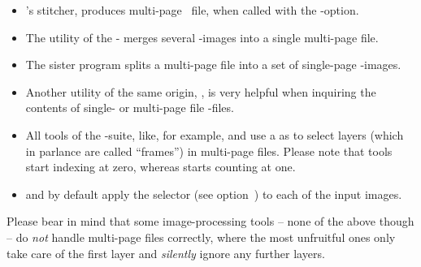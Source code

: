\begin{itemize}
\item
  's stitcher, 
  produces multi-page ~file, when called with the -option.

\item
  The utility  of the
  - merges several
  -images into a single multi-page file.

\item
  The sister program  splits a
  multi-page file into a set of single-page -images.

\item
  Another utility of the same origin, , is
  very helpful when inquiring the contents of single- or multi-page file -files.

\item
  All tools of the -suite, like, for example,
   and  use a
   as \App{} to select layers
  (which in  parlance are called ``frames'') in multi-page files.
  Please note that  tools start indexing at zero, whereas \App{} starts
  counting at one.

\item
  \App{} and \OtherApp{} by default apply the  selector (see
  option~) to each of the input
  images.
\end{itemize}

Please bear in mind that some image-processing tools -- none of the above though -- do
\emph{not} handle multi-page files correctly, where the most unfruitful ones only take care of
the first layer and \emph{silently} ignore any further layers.



